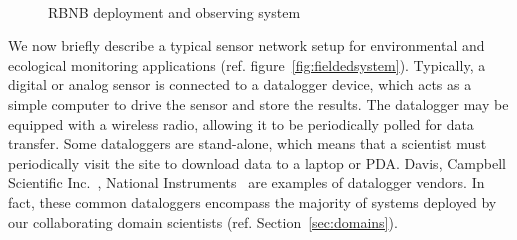 \begin{figure}
\begin{center}
\mbox{
 \quad
{}
}
\caption{RBNB deployment and observing system}
\label{fig:rbnb-general-arch}
\end{center}
\end{figure}    

We now briefly describe a typical sensor network setup for environmental and ecological monitoring applications (ref. figure~\ref{fig:fieldedsystem}). Typically, a digital or analog sensor is connected to a datalogger device, which acts as a simple computer to drive the sensor and store the results. The datalogger may be equipped with a wireless radio, allowing it to be periodically polled for data transfer. Some dataloggers are stand-alone, which means that a scientist must periodically visit the site to download data to a laptop or PDA. Davis, Campbell Scientific  Inc.~\cite{campbell}, National Instruments~\cite{ni} are examples of 
datalogger vendors. In fact, these common dataloggers encompass the majority of systems deployed by our collaborating domain scientists (ref. Section~\ref{sec:domains}). 


